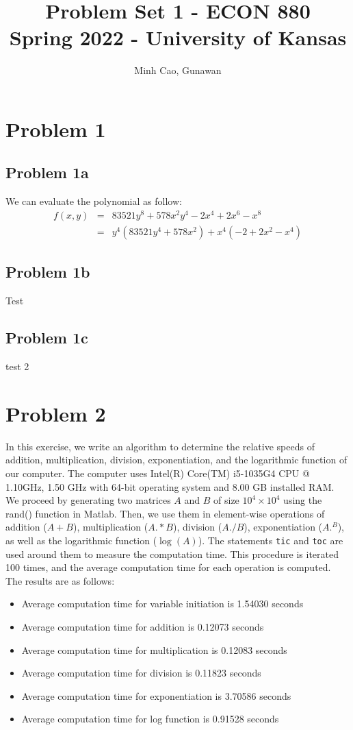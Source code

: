 \documentclass[11pt]{article}
\title{Problem Set 1 - ECON 880\\
	\small Spring 2022 - University of Kansas}
\author{Minh Cao, Gunawan}
\newcommand{\1}{\mathbbm{1}}
\begin{document}
\maketitle	
\section*{Problem 1}
\subsection*{Problem 1a}
We can evaluate the polynomial as follow:\\
\begin{eqnarray*}
f(x,y) 	&=& 83521y^8+578x^{2}y^{4} -2x^{4}+2x^{6}-x^{8}\\
 		&=& y^{4}(83521y^{4}+578x^{2})+x^{4}(-2+2x^{2}-x^{4})
\end{eqnarray*}
\subsection*{Problem 1b}
	Test
\subsection*{Problem 1c}
	test 2
\section*{Problem 2}
In this exercise, we write an algorithm to determine the relative speeds of addition, multiplication, division, exponentiation, and the logarithmic function of our computer. The computer uses Intel(R) Core(TM) i5-1035G4 CPU @ 1.10GHz, 1.50 GHz with 64-bit operating system and 8.00 GB installed RAM. We proceed by generating two matrices $A$ and $B$ of size $10^4\times10^4$ using the rand() function in Matlab. Then, we use them in element-wise operations of addition ($A+B$), multiplication ($A.*B$), division ($A./B$), exponentiation ($A.^B$), as well as the logarithmic function ($\log(A)$). The statements \texttt{tic} and \texttt{toc} are used around them to measure the computation time. This procedure is iterated 100 times, and the average computation time for each operation is computed. The results are as follows:
	\begin{itemize}
	\item Average computation time for variable initiation is 1.54030 seconds
	\item Average computation time for addition is 0.12073 seconds
	\item Average computation time for multiplication is 0.12083 seconds
	\item Average computation time for division is 0.11823 seconds
	\item Average computation time for exponentiation is 3.70586 seconds
	\item Average computation time for log function is 0.91528 seconds
	\end{itemize}
\end{document}
